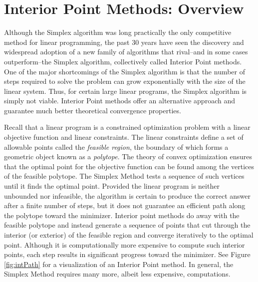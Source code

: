 
\section*{Interior Point Methods: Overview}
Although the Simplex algorithm was long practically the only competitive method for linear programming, the past 30 years have seen the
discovery and widespread adoption of a new family of algorithms that rival--and in some cases outperform--the Simplex algorithm, collectively
called Interior Point methods. One of the major shortcomings of the Simplex algorithm is that the number of steps required to solve the
problem can grow exponentially with the size of the linear system. Thus, for certain large linear programs, the Simplex algorithm is simply
not viable. Interior Point methods offer an alternative approach and guarantee much better theoretical convergence properties.

Recall that a linear program is a constrained optimization problem with a linear objective function and linear constraints.
The linear constraints define a set of allowable points called the \emph{feasible region}, the boundary of which forms a geometric
object known as a \emph{polytope}. The theory of convex optimization ensures that the optimal point for the objective function
can be found among the vertices of the feasible polytope. The Simplex Method tests a sequence of such vertices until it finds
the optimal point. Provided the linear program is neither unbounded nor infeasible, the algorithm is certain to produce the correct
answer after a finite number of steps, but it does not guarantee an efficient path along the polytope toward the minimizer. Interior
point methods do away with the feasible polytope and instead generate a sequence of points that cut through the interior (or
exterior) of the feasible region and converge iteratively to the optimal point. Although it is computationally more expensive to
compute such interior points, each step results in significant progress toward the minimizer. See Figure \ref{fig:intPath} for
a visualization of an Interior Point method. In general, the Simplex Method requires many more, albeit less expensive, computations.

